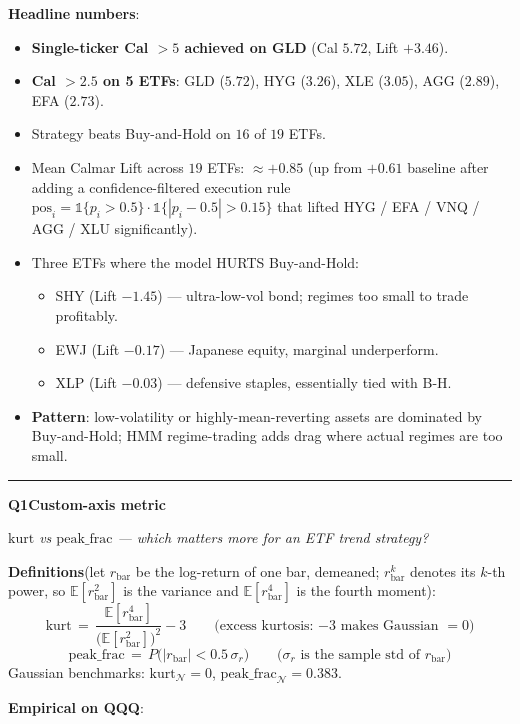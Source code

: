 \documentclass[11pt]{article}
\newcommand{\qhead}[2]{%
  \par\vspace{6pt}%
  \noindent\rule{\linewidth}{0.5pt}\par\vspace{2pt}%
  \noindent\textbf{\Large #1}\par\vspace{3pt}%
  \noindent\textit{#2}\par\vspace{6pt}}
\begin{document}
\smallskip
\textbf{Headline numbers}:
\begin{itemize}
\item \textbf{Single-ticker Cal $> 5$ achieved on GLD} (Cal $5.72$, Lift $+3.46$).
\item \textbf{Cal $> 2.5$ on 5 ETFs}: GLD ($5.72$), HYG ($3.26$), XLE ($3.05$), AGG ($2.89$), EFA ($2.73$).
\item Strategy beats Buy-and-Hold on $16$ of $19$ ETFs.
\item Mean Calmar Lift across $19$ ETFs: $\approx +0.85$ (up from $+0.61$ baseline after adding a confidence-filtered execution rule $\text{pos}_i = \mathbb{1}\{p_i > 0.5\} \cdot \mathbb{1}\{|p_i - 0.5| > 0.15\}$ that lifted HYG / EFA / VNQ / AGG / XLU significantly).
\item Three ETFs where the model HURTS Buy-and-Hold:
  \begin{itemize}
  \item SHY (Lift $-1.45$) --- ultra-low-vol bond; regimes too small to trade profitably.
  \item EWJ (Lift $-0.17$) --- Japanese equity, marginal underperform.
  \item XLP (Lift $-0.03$) --- defensive staples, essentially tied with B-H.
  \end{itemize}
\item \textbf{Pattern}: low-volatility or highly-mean-reverting assets are dominated by Buy-and-Hold; HMM regime-trading adds drag where actual regimes are too small.
\end{itemize}

\newpage

\qhead{Q1\enspace Custom-axis metric}{$\mathrm{kurt}$ vs $\mathrm{peak\_frac}$ --- which matters more for an ETF trend strategy?}

\textbf{Definitions}\enspace (let $r_{\mathrm{bar}}$ be the log-return of one bar, demeaned; $r_{\mathrm{bar}}^k$ denotes its $k$-th power, so $\mathbb{E}[r_{\mathrm{bar}}^2]$ is the variance and $\mathbb{E}[r_{\mathrm{bar}}^4]$ is the fourth moment):
\[ \mathrm{kurt} \,=\, \frac{\mathbb{E}[r_{\mathrm{bar}}^4]}{\bigl(\mathbb{E}[r_{\mathrm{bar}}^2]\bigr)^2} - 3
   \qquad\text{(excess kurtosis: $-3$ makes Gaussian $= 0$)} \]
\[ \mathrm{peak\_frac} \,=\, P\bigl(|r_{\mathrm{bar}}| < 0.5\,\sigma_{r}\bigr) \qquad\text{($\sigma_r$ is the sample std of $r_{\mathrm{bar}}$)} \]
Gaussian benchmarks: $\mathrm{kurt}_{\mathcal N} = 0$, $\mathrm{peak\_frac}_{\mathcal N} = 0.383$.

\textbf{Empirical on QQQ}:
\end{document}
